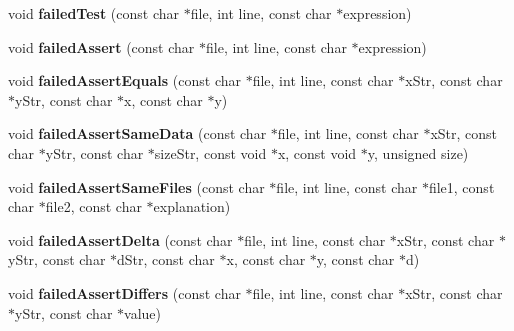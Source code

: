 \begin{DoxyCompactItemize}
\item 
\hypertarget{classCxxTest_1_1TeeListener_af4a0a7700069660c53027194f69c7e9e}{void {\bfseries failed\-Test} (const char $\ast$file, int line, const char $\ast$expression)}\label{classCxxTest_1_1TeeListener_af4a0a7700069660c53027194f69c7e9e}

\item 
\hypertarget{classCxxTest_1_1TeeListener_a8af550a6169a8188af166a41363caf35}{void {\bfseries failed\-Assert} (const char $\ast$file, int line, const char $\ast$expression)}\label{classCxxTest_1_1TeeListener_a8af550a6169a8188af166a41363caf35}

\item 
\hypertarget{classCxxTest_1_1TeeListener_a5064986ca68aae4b44594b5b4e5760af}{void {\bfseries failed\-Assert\-Equals} (const char $\ast$file, int line, const char $\ast$x\-Str, const char $\ast$y\-Str, const char $\ast$x, const char $\ast$y)}\label{classCxxTest_1_1TeeListener_a5064986ca68aae4b44594b5b4e5760af}

\item 
\hypertarget{classCxxTest_1_1TeeListener_a50272bb04e124e70a0eabadfceb9aa04}{void {\bfseries failed\-Assert\-Same\-Data} (const char $\ast$file, int line, const char $\ast$x\-Str, const char $\ast$y\-Str, const char $\ast$size\-Str, const void $\ast$x, const void $\ast$y, unsigned size)}\label{classCxxTest_1_1TeeListener_a50272bb04e124e70a0eabadfceb9aa04}

\item 
\hypertarget{classCxxTest_1_1TeeListener_ae97758de2df8f47f207695bbe7dee25b}{void {\bfseries failed\-Assert\-Same\-Files} (const char $\ast$file, int line, const char $\ast$file1, const char $\ast$file2, const char $\ast$explanation)}\label{classCxxTest_1_1TeeListener_ae97758de2df8f47f207695bbe7dee25b}

\item 
\hypertarget{classCxxTest_1_1TeeListener_a5d2fcad6f8776e6a68b46faaee06fa20}{void {\bfseries failed\-Assert\-Delta} (const char $\ast$file, int line, const char $\ast$x\-Str, const char $\ast$y\-Str, const char $\ast$d\-Str, const char $\ast$x, const char $\ast$y, const char $\ast$d)}\label{classCxxTest_1_1TeeListener_a5d2fcad6f8776e6a68b46faaee06fa20}

\item 
\hypertarget{classCxxTest_1_1TeeListener_a60795ce231c99b5a3e274c1fcd52638e}{void {\bfseries failed\-Assert\-Differs} (const char $\ast$file, int line, const char $\ast$x\-Str, const char $\ast$y\-Str, const char $\ast$value)}\label{classCxxTest_1_1TeeListener_a60795ce231c99b5a3e274c1fcd52638e}


\end{DoxyCompactItemize}
